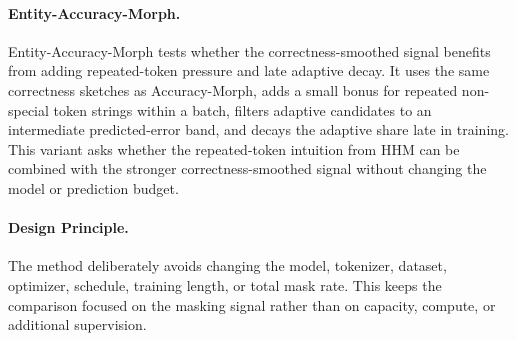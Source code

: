 \paragraph{Entity-Accuracy-Morph.}
Entity-Accuracy-Morph tests whether the correctness-smoothed signal benefits from adding repeated-token pressure and late adaptive decay. It uses the same correctness sketches as Accuracy-Morph, adds a small bonus for repeated non-special token strings within a batch, filters adaptive candidates to an intermediate predicted-error band, and decays the adaptive share late in training. This variant asks whether the repeated-token intuition from HHM can be combined with the stronger correctness-smoothed signal without changing the model or prediction budget.

\paragraph{Design Principle.}
The method deliberately avoids changing the model, tokenizer, dataset, optimizer, schedule, training length, or total mask rate. This keeps the comparison focused on the masking signal rather than on capacity, compute, or additional supervision.
